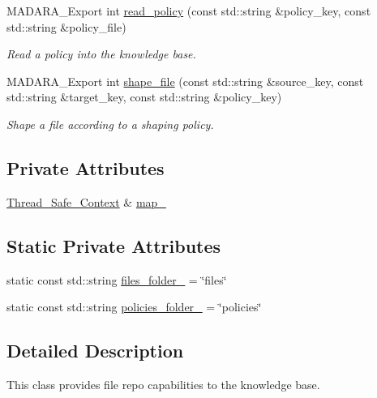 \begin{DoxyCompactItemize}
MADARA\_\-Export int \hyperlink{classMadara_1_1Knowledge__Engine_1_1Files_a25fb09fc8627195854a269404b897e46}{read\_\-policy} (const std::string \&policy\_\-key, const std::string \&policy\_\-file)
\begin{DoxyCompactList}\small\item\em Read a policy into the knowledge base. \item\end{DoxyCompactList}\item 
MADARA\_\-Export int \hyperlink{classMadara_1_1Knowledge__Engine_1_1Files_a32764f12df3f5e11bb9489886ebc4d2a}{shape\_\-file} (const std::string \&source\_\-key, const std::string \&target\_\-key, const std::string \&policy\_\-key)
\begin{DoxyCompactList}\small\item\em Shape a file according to a shaping policy. \item\end{DoxyCompactList}\end{DoxyCompactItemize}
\subsection*{Private Attributes}
\begin{DoxyCompactItemize}
\item 
\hyperlink{classMadara_1_1Knowledge__Engine_1_1Thread__Safe__Context}{Thread\_\-Safe\_\-Context} \& \hyperlink{classMadara_1_1Knowledge__Engine_1_1Files_afc3782f34e690175d5c414dd9d4aa25e}{map\_\-}
\end{DoxyCompactItemize}
\subsection*{Static Private Attributes}
\begin{DoxyCompactItemize}
\item 
static const std::string \hyperlink{classMadara_1_1Knowledge__Engine_1_1Files_a2059e0bb921e2bd4d6b87c242a258e75}{files\_\-folder\_\-} = \char`\"{}files\char`\"{}
\item 
static const std::string \hyperlink{classMadara_1_1Knowledge__Engine_1_1Files_a866b4e450bec51b106be07193b65676a}{policies\_\-folder\_\-} = \char`\"{}policies\char`\"{}
\end{DoxyCompactItemize}


\subsection{Detailed Description}
This class provides file repo capabilities to the knowledge base. 

